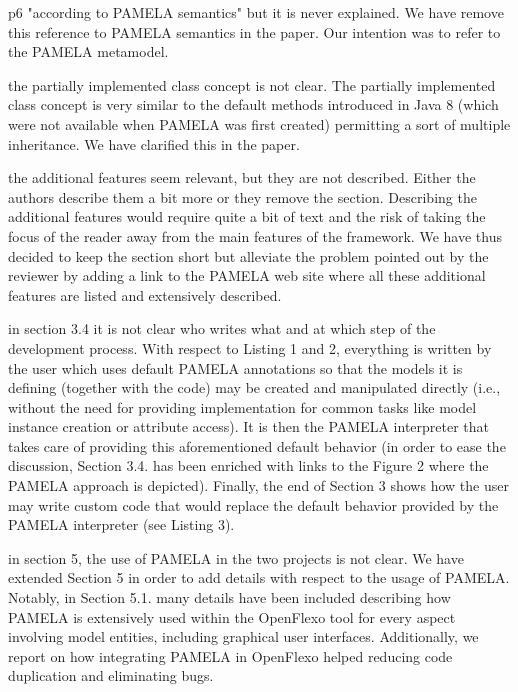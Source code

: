 \documentclass[10pt]{article}
\begin{document}
\begin{response}{p6 "according to PAMELA semantics" but it is never explained.}
We have remove this reference to PAMELA semantics in the paper. Our intention was to refer to the PAMELA metamodel.
\end{response}

\begin{response}{the partially implemented class concept is not clear.}
The partially implemented class concept is very similar to the default methods introduced in Java 8 (which were not available when PAMELA was first created) permitting a sort of multiple inheritance. We have clarified this in the paper.
\end{response}

\begin{response}{the additional features seem relevant, but they are not described. Either the authors describe them a bit more or they remove the section.}
Describing the additional features would require quite a bit of text and the risk of taking the focus of the reader away from the main features of the framework. We have thus decided to keep the section short but alleviate the problem pointed out by the reviewer by adding a link to the PAMELA web site where all these additional features are listed and extensively described.
\end{response}


\begin{response}{in section 3.4 it is not clear who writes what and at which step of the development process.}
With respect to Listing 1 and 2, everything is written by the user which uses default PAMELA annotations so that the models it is defining (together with the code) may be created and manipulated directly (i.e., without the need for providing implementation for common tasks like model instance creation or attribute access). It is then the PAMELA interpreter that takes care of providing this aforementioned default behavior (in order to ease the discussion, Section 3.4. has been enriched with links to the Figure 2 where the PAMELA approach is depicted). Finally, the end of Section 3 shows how the user may write custom code that would replace the default behavior provided by the PAMELA interpreter (see Listing 3).
\end{response}

\begin{response}{in section 5, the use of PAMELA in the two projects is not clear.}
We have extended Section 5 in order to add details with respect to the usage of PAMELA. Notably, in Section 5.1. many details have been included describing how PAMELA is extensively used within the OpenFlexo tool for every aspect involving model entities, including graphical user interfaces. Additionally, we report on how integrating PAMELA in OpenFlexo helped reducing code duplication and eliminating bugs.
\end{response}
\end{document}
